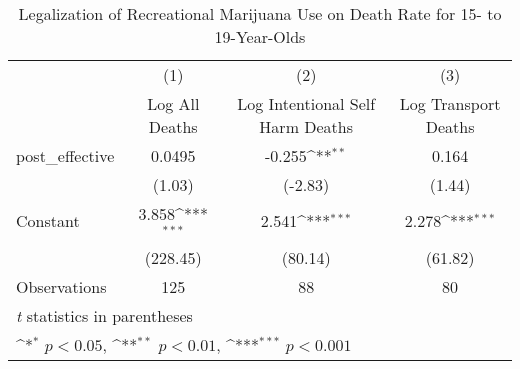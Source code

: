 \begin{table}[htbp]\centering
\def\sym#1{\ifmmode^{#1}\else\(^{#1}\)\fi}
\caption{Legalization of Recreational Marijuana Use on Death Rate for 15- to 19-Year-Olds}
\begin{tabular}{l*{3}{c}}
\hline\hline
                    &\multicolumn{1}{c}{(1)}&\multicolumn{1}{c}{(2)}&\multicolumn{1}{c}{(3)}\\
                    &\multicolumn{1}{c}{Log All Deaths}&\multicolumn{1}{c}{Log Intentional Self Harm Deaths}&\multicolumn{1}{c}{Log Transport Deaths}\\
\hline
post\_effective      &      0.0495         &      -0.255\sym{**} &       0.164         \\
                    &      (1.03)         &     (-2.83)         &      (1.44)         \\
[1em]
Constant            &       3.858\sym{***}&       2.541\sym{***}&       2.278\sym{***}\\
                    &    (228.45)         &     (80.14)         &     (61.82)         \\
\hline
Observations        &         125         &          88         &          80         \\
\hline\hline
\multicolumn{4}{l}{\footnotesize \textit{t} statistics in parentheses}\\
\multicolumn{4}{l}{\footnotesize \sym{*} \(p<0.05\), \sym{**} \(p<0.01\), \sym{***} \(p<0.001\)}\\
\end{tabular}
\end{table}
